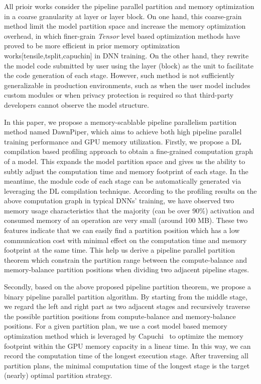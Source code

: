 All prioir works consider the pipeline parallel partition and memory optimization
in a coarse granularity at layer or layer block.
On one hand, this coarse-grain method limit the model partition space
and increase the memory optimization overhead, in which finer-grain \emph{Tensor} level
based optimization methods have proved to be more efficient in prior
memory optimization works[tensile,tsplit,capuchin] in DNN training.
On the other hand, they rewrite the model code submitted by user
using the layer (block) as the unit to facilitate the code generation of each stage.
However, such method is not sufficiently generalizable in production environments,
such as when the user model includes custom modules or when privacy protection
is required so that third-party developers cannot observe the model structure.

In this paper, we propose a memory-scablable pipeline parallelism partition method named DawnPiper,
which aims to achieve both high pipeline parallel training performance and GPU memory utilization.
Firstly, we propose a DL compilation based profiling approach
to obtain a fine-grained computation graph of a model.
This expands the model partition space and gives us the ability
to subtly adjust the computation time and memory footprint of each stage.
In the meantime, the module code of each stage can be automatically generated
via leveraging the DL compilation technique.
According to the profiling results on the above computation graph in typical DNNs' training,
we have observed two memory usage characteristics that
the majority (can be over 90\%) activation and consumed memory of an operation
are very small (around 100 MB).
These two features indicate that 
we can easily find a partition position
which has a low communication cost 
with minimal effect on the computation time and memory footprint at the same time.
This help us derive a pipeline parallel partition theorem
which constrain the partition range between the compute-balance and memory-balance partition positions
when dividing two adjacent pipeline stages.

Secondly, based on the above proposed pipeline partition theorem,
we propose a binary pipeline parallel partition algorithm.
By starting from the middle stage,
we regard the left and right part as two adjacent stages and
recursively traverse the possible partition positions
from compute-balance and memory-balance positions.
For a given partition plan,
we use a cost model based memory optimization method which is leveraged by Capuchi~\cite{pengCapuchinTensorbasedGPU2020}
to optimize the memory footprint within the GPU memory capacity in a linear time.
In this way, we can record the computation time of the longest execution stage.
After traversing all partition plans,
the minimal computation time of the longest stage
is the target (nearly) optimal partition strategy.

